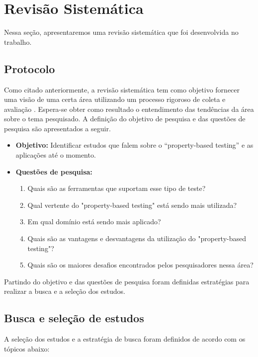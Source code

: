 \section{Revisão Sistemática} \label{sec:revisao_sistematica}


Nessa seção, apresentaremos uma revisão sistemática que foi desenvolvida no trabalho. 

\subsection{Protocolo}

Como citado anteriormente, a revisão sistemática tem como objetivo fornecer uma visão de uma certa área utilizando um processo rigoroso de coleta e avaliação \cite{petersen2008systematic}. Espera-se obter como resultado o entendimento das tendências da área sobre o tema pesquisado.  A definição do objetivo de pesquisa e das questões de pesquisa são apresentados a seguir. 

\begin{itemize}
    \item \textbf{Objetivo:} Identificar estudos que falem sobre o “property-based testing” e as aplicações até o momento.
    \item \textbf{Questões de pesquisa:} 
    \begin{enumerate}
        \item Quais são as ferramentas que suportam esse tipo de teste?
        \item Qual vertente do "property-based testing" está sendo mais utilizada?
        \item Em qual domínio está sendo mais aplicado?
        \item Quais são as vantagens e desvantagens da utilização do "property-based testing"?
        \item Quais são os maiores desafios encontrados pelos pesquisadores nessa área?
    \end{enumerate}
\end{itemize}

Partindo do objetivo e das questões de pesquisa foram definidas estratégias para realizar a busca e a seleção dos estudos.

\subsection{Busca e seleção de estudos}

A seleção dos estudos e a estratégia de busca foram definidos de acordo com os tópicos abaixo: 

